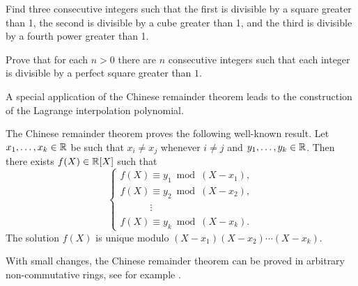 \begin{bonus}
\label{xca:consecutive}
Find three consecutive integers such that the first is divisible by a square
greater than 1, the second is divisible by a cube greater than 1, and the third
is divisible by a fourth power greater than 1.
\end{bonus}

\begin{bonus}
\label{xca:perfect_square}
  Prove that for each $n>0$ there are $n$ consecutive integers such that each
  integer is divisible by a perfect square greater than $1$.
\end{bonus}

A special application of the Chinese remainder theorem leads to the
construction of the Lagrange interpolation polynomial.

\begin{bonus}
	The Chinese remainder theorem proves the following well-known result. 
	Let $x_1,\dots,x_k\in\mathbb{R}$ be such that $x_i\ne x_j$ whenever $i\ne j$ 
	and $y_1,\dots,y_k\in\mathbb{R}$. Then there exists $f(X)\in\mathbb{R}[X]$ such that
	\[
	\begin{cases}
		f(X)\equiv y_1\bmod (X-x_1),\\
		f(X)\equiv y_2\bmod (X-x_2),\\
		\phantom{f(X)}\vdots\\
		f(X)\equiv y_k\bmod (X-x_k).  	
	\end{cases}
 	\]
 	The solution $f(X)$ is unique modulo $(X-x_1)(X-x_2)\cdots (X-x_k)$. 
\end{bonus}



With small changes, the Chinese remainder theorem can be proved 
in arbitrary non-commutative rings, see for example 
\cite[Chapter III, Theorem 2.25]{MR600654}. 
